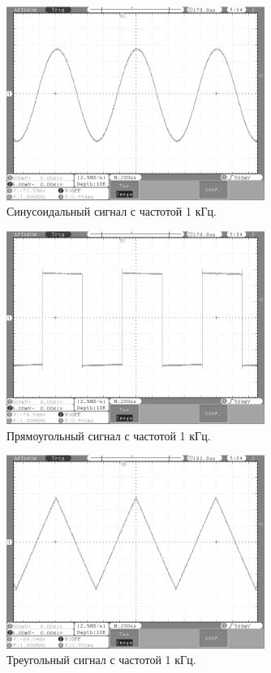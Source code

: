 	\begin{figure}[H]
    \centering
    \includegraphics[width=0.75\textwidth]{../image/sin1.bmp}
    \caption{Синусоидальный сигнал с частотой 1 кГц.}
	\end{figure}	
	
	\begin{figure}[H]
    \centering
    \includegraphics[width=0.75\textwidth]{../image/square1.bmp}
    \caption{Прямоугольный сигнал с частотой 1 кГц.}
	\end{figure}	
	
	\begin{figure}[H]
    \centering
    \includegraphics[width=0.75\textwidth]{../image/triangle1.bmp}
    \caption{Треугольный сигнал с частотой 1 кГц.}
	\end{figure}	

